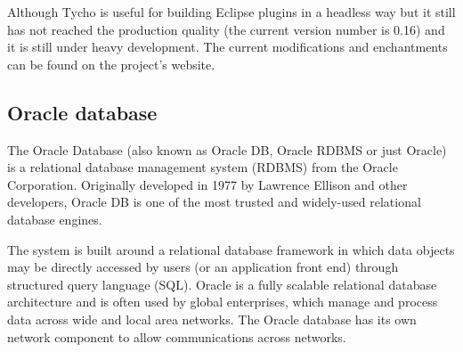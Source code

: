 Although Tycho is useful for building Eclipse plugins in a headless way but it
still has not reached the production quality (the current version number is
0.16) and it is still under heavy development. The current modifications and
enchantments can be found on the project's website.


\subsection{Oracle database}
The Oracle Database (also known as Oracle DB, Oracle RDBMS or just Oracle) is a
relational database management system (RDBMS) from the Oracle Corporation.
Originally developed in 1977 by Lawrence Ellison and other developers, Oracle DB
is one of the most trusted and widely-used relational database engines.

The system is built around a relational database framework in which data objects
may be directly accessed by users (or an application front end) through
structured query language (SQL). Oracle is a fully scalable relational database
architecture and is often used by global enterprises, which manage and process
data across wide and local area networks. The Oracle database has its own
network component to allow communications across networks.



